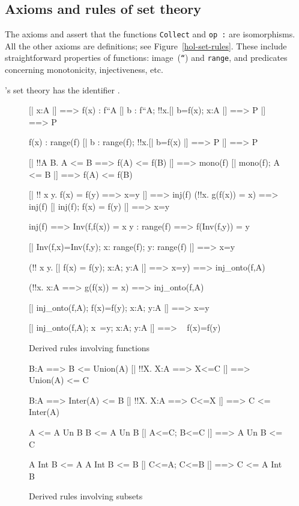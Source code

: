 \subsection{Axioms and rules of set theory}
The axioms  and
 assert that the functions {\tt Collect} and
\hbox{\tt op :} are isomorphisms. 
All the other axioms are definitions; see Figure~\ref{hol-set-rules}.
These include straightforward properties of functions: image~({\tt``}) and
{\tt range}, and predicates concerning monotonicity, injectiveness, etc.

{\HOL}'s set theory has the {\ML} identifier .

\begin{figure} \makeatother
\begin{ttbox}
     [| x:A |] ==> f(x) : f``A
     [| b : f``A;  !!x.[| b=f(x);  x:A |] ==> P |] ==> P

     f(x) : range(f)
     [| b : range(f);  !!x.[| b=f(x) |] ==> P |] ==> P

      [| !!A B. A <= B ==> f(A) <= f(B) |] ==> mono(f)
      [| mono(f);  A <= B |] ==> f(A) <= f(B)

       [| !! x y. f(x) = f(y) ==> x=y |] ==> inj(f)
              (!!x. g(f(x)) = x) ==> inj(f)
       [| inj(f); f(x) = f(y) |] ==> x=y

    inj(f) ==> Inv(f,f(x)) = x
    y : range(f) ==> f(Inv(f,y)) = y

    [| Inv(f,x)=Inv(f,y); x: range(f);  y: range(f) |] ==> x=y

    (!! x y. [| f(x) = f(y); x:A; y:A |] ==> x=y) ==> inj_onto(f,A)

    (!!x. x:A ==> g(f(x)) = x) ==> inj_onto(f,A)

    [| inj_onto(f,A);  f(x)=f(y);  x:A;  y:A |] ==> x=y

    [| inj_onto(f,A);  x~=y;  x:A;  y:A |] ==> ~ f(x)=f(y)
\end{ttbox}
\caption{Derived rules involving functions} \label{hol-fun}
\end{figure}


\begin{figure} \makeatother
\begin{ttbox}
     B:A ==> B <= Union(A)
     [| !!X. X:A ==> X<=C |] ==> Union(A) <= C

     B:A ==> Inter(A) <= B
  [| !!X. X:A ==> C<=X |] ==> C <= Inter(A)

       A <= A Un B
       B <= A Un B
        [| A<=C;  B<=C |] ==> A Un B <= C

      A Int B <= A
      A Int B <= B
    [| C<=A;  C<=B |] ==> C <= A Int B
\end{ttbox}
\caption{Derived rules involving subsets} \label{hol-subset}
\end{figure}


